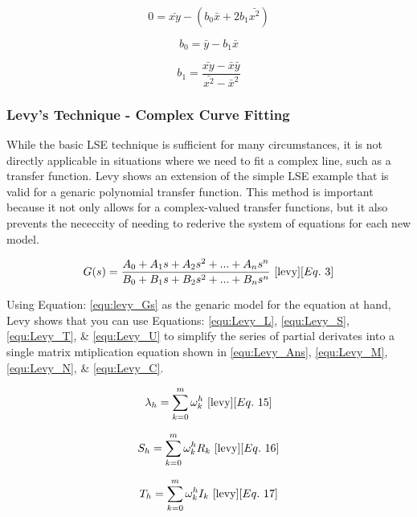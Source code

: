 \begin{equation}
\label{equ:LSE_solb}
0 = \bar{xy} - (b_0 \bar{x} + 2b_1 \bar{x^2})
\end{equation}

\begin{equation}
\label{equ:LSE_solc}
b_0 = \bar{y} - b_1 \bar{x}
\end{equation}

\begin{equation}
\label{equ:LSE_sold}
b_1 = \frac{\bar{xy} - \bar{x}\bar{y}}{\bar{x^2} - \bar{x}^2}
\end{equation}

\subsubsection{Levy's Technique - Complex Curve Fitting}
While the basic LSE technique is sufficient for many circumstances, it is not directly applicable in situations where we need to fit a complex line, such as a transfer function. Levy \cite{levy} shows an extension of the simple LSE example that is valid for a genaric polynomial transfer function. This method is important because it not only allows for a complex-valued transfer functions, but it also prevents the nececcity of needing to rederive the system of equations for each new model. 

\begin{equation}
\label{equ:levy_Gs}
G(s) = \frac{A_0 + A_1 s + A_2 s^2 + ... + A_n s^n}{B_0 + B_1 s + B_2 s^2 + ... + B_n s^n}
~\cite{levy}[Eq.~3]
\end{equation}

Using Equation: \eqref{equ:levy_Gs} as the genaric model for the equation at hand, Levy shows that you can use Equations: \eqref{equ:Levy_L}, \eqref{equ:Levy_S}, \eqref{equ:Levy_T}, \& \eqref{equ:Levy_U} to simplify the series of partial derivates into a single matrix mtiplication equation shown in \eqref{equ:Levy_Ans}, \eqref{equ:Levy_M}, \eqref{equ:Levy_N}, \& \eqref{equ:Levy_C}.

\begin{equation}
\label{equ:Levy_L}
\lambda _h = \sum_{k=0}^{m} \omega _k ^h
~\cite{levy}[Eq.~15]
\end{equation}

\begin{equation}
\label{equ:Levy_S}
S_h = \sum_{k=0}^{m} \omega _k ^h R_k
~\cite{levy}[Eq.~16]
\end{equation}

\begin{equation}
\label{equ:Levy_T}
T_h = \sum_{k=0}^{m} \omega _k ^h I_k
~\cite{levy}[Eq.~17]
\end{equation}

